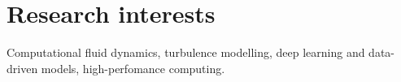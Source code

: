 \documentclass[line]{res}
\newenvironment{p}
  {\begin{adjustwidth}{-10pt}{0pt}}
  {\end{adjustwidth}}
\begin{document}


\begin{resume}
\section{}
\vspace{-15pt} 
\hfill

\noindent

\section{Research interests}
\begin{p}
Computational fluid dynamics, turbulence modelling, deep learning and data-driven models, high-perfomance computing. 
\end{p}
 

\end{resume}
\end{document}

